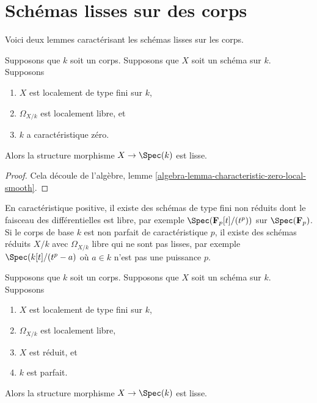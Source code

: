 \section{Schémas lisses sur des corps}
\label{section-smooth}

\noindent
Voici deux lemmes caractérisant les schémas lisses sur les corps.

\begin{lemma}
\label{lemma-char-zero-differentials-free-smooth}
Supposons que $k$ soit un corps. Supposons
que $X$ soit un schéma sur $k$. Supposons
\begin{enumerate}
\item $X$ est localement de type fini sur
$k$, \item $\Omega_{X/k}$ est localement
libre, et \item $k$ a caractéristique zéro.
\end{enumerate}
Alors la structure morphisme $X \to \Spec(k)$ est lisse.
\end{lemma}

\begin{proof}
Cela découle de l'algèbre, lemme
\ref{algebra-lemma-characteristic-zero-local-smooth}.
\end{proof}

\noindent
En caractéristique positive, il existe des schémas de type
fini non réduits dont le faisceau des différentielles est
libre, par exemple $\Spec(\mathbf{F}_p[t]/(t^p))$ sur
$\Spec(\mathbf{F}_p)$. Si le corps de base $k$ est non parfait
de caractéristique $p$, il existe des schémas réduits $X/k$
avec $\Omega_{X/k}$ libre qui ne sont pas lisses, par exemple
$\Spec(k[t]/(t^p-a)$ où $a \in k$ n'est pas une puissance $p$.

\begin{lemma}
\label{lemma-char-p-differentials-free-smooth}
Supposons que $k$ soit un corps. Supposons
que $X$ soit un schéma sur $k$. Supposons
\begin{enumerate}
\item $X$ est localement de type
fini sur $k$, \item $\Omega_{X/k}$
est localement libre, \item $X$ est
réduit, et \item $k$ est parfait.
\end{enumerate}
Alors la structure morphisme $X \to \Spec(k)$ est lisse.
\end{lemma}


